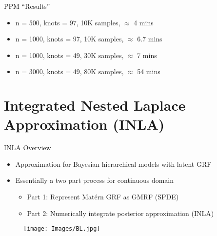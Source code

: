 \documentclass{beamer}
\begin{document}
\begin{frame}{PPM ``Results''}

      \begin{itemize}
      \addtolength{\itemsep}{0.5\baselineskip}
      \item n = 500, knots = 97, 10K samples, $\approx$ 4 mins
      \item n = 1000, knots = 97, 10K samples, $\approx$ 6.7 mins
      \item n = 1000, knots = 49, 30K samples, $\approx$ 7 mins
      \item n = 3000, knots = 49, 80K samples, $\approx$ 54 mins
      \end{itemize}


\end{frame}

\section{Integrated Nested Laplace Approximation (INLA)}

\begin{frame}{INLA Overview}

\begin{itemize}
\addtolength{\itemsep}{0.5\baselineskip}
\item Approximation for Bayesian hierarchical models with latent GRF
\item Essentially a two part process for continuous domain
  \begin{itemize}
  \addtolength{\itemsep}{0.5\baselineskip}
  \item Part 1: Represent Mat\'ern GRF as GMRF (SPDE)
  \item Part 2: Numerically integrate posterior approximation (INLA)
  \end{itemize}
\end{itemize}
  \begin{figure}[H]
	\centering
	\texttt{[image: Images/BL.jpg]}
	\end{figure}

\end{frame}
\end{document}

